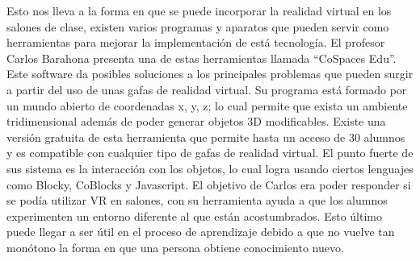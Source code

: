 Esto nos lleva a la forma en que se puede incorporar la realidad virtual en los salones de clase, existen varios programas y aparatos que pueden servir como herramientas para mejorar la implementación de está tecnología. El profesor Carlos Barahona presenta una de estas herramientas llamada “CoSpaces Edu”. Este software da posibles soluciones a los principales problemas que pueden surgir a partir del uso de unas gafas de realidad virtual. Su programa está formado por un mundo abierto de coordenadas x, y, z; lo cual permite que exista un ambiente tridimensional además de poder generar objetos 3D modificables. Existe una versión gratuita de esta herramienta que permite hasta un acceso de 30 alumnos y es compatible con cualquier tipo de gafas de realidad virtual. El punto fuerte de sus sistema es la interacción con los objetos, lo cual logra usando ciertos lenguajes como Blocky, CoBlocks y Javascript. El objetivo de Carlos era poder responder si se podía utilizar VR en salones, con su herramienta ayuda a que los alumnos experimenten un entorno diferente al que están acostumbrados. Esto último puede llegar a ser útil en el proceso de aprendizaje debido a que no vuelve tan monótono la forma en que una persona obtiene conocimiento nuevo. \cite{barahona2019cospaces}
